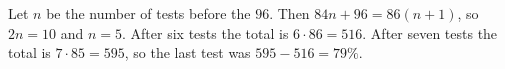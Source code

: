 Let $n$ be the number of tests before the $96$. Then $84n+96=86(n+1)$, so $2n=10$ and $n=5$. After six tests the total is $6\cdot86=516$. After seven tests the total is $7\cdot85=595$, so the last test was $595-516=\boxed{79\%}$.
